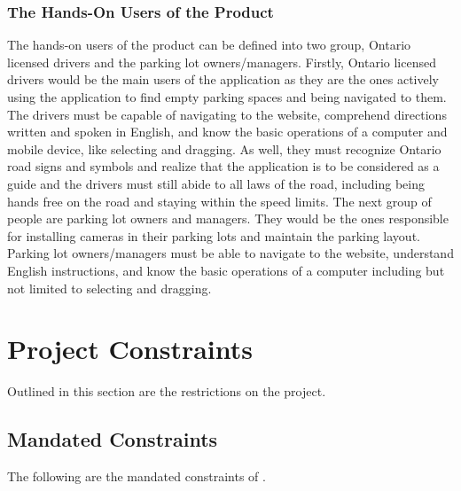 \documentclass[12pt,letterpaper]{article}
\begin{document}
\subsubsection{The Hands-On Users of the Product}
The hands-on users of the product can be defined into two group, Ontario
licensed drivers and the parking lot owners/managers. Firstly, Ontario licensed
drivers would be the main users of the application as they are the ones actively
using the application to find empty parking spaces and being navigated to them.
The drivers must be capable of navigating to the website, comprehend directions
written and spoken in English, and know the basic operations of a computer and
mobile device, like selecting and dragging. As well, they must recognize Ontario
road signs and symbols and realize that the application is to be considered as a
guide and the drivers must still abide to all laws of the road, including being
hands free on the road and staying within the speed limits. The next group of
people are parking lot owners and managers. They would be the ones responsible
for installing cameras in their parking lots and maintain the parking layout.
Parking lot owners/managers must be able to navigate to the website, understand
English instructions, and know the basic operations of a computer including but
not limited to selecting and dragging.

\newpage
\section{Project Constraints}
Outlined in this section are the restrictions on the project.
\subsection{Mandated Constraints}
The following are the mandated constraints of \progname.
\end{document}
